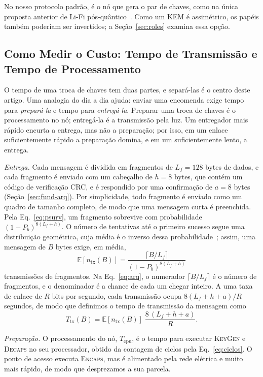 \documentclass[12pt]{article}
\begin{document}
No nosso protocolo padrão, é o nó que gera o par de chaves, como na única
proposta anterior de Li-Fi pós-quântico~\cite{nurmurodov2025esp32}. Como um KEM
é assimétrico, os papéis também poderiam ser invertidos; a
Seção~\ref{sec:roles} examina essa opção.

\subsection{Como Medir o Custo: Tempo de Transmissão e Tempo de Processamento}\label{sec:cost}
O tempo de uma troca de chaves tem duas partes, e separá-las é o centro deste
artigo. Uma analogia do dia a dia ajuda: enviar uma encomenda exige tempo para
\emph{prepará-la} e tempo para \emph{entregá-la}. Preparar uma troca de chaves
é o processamento no nó; entregá-la é a transmissão pela luz. Um entregador
mais rápido encurta a entrega, mas não a preparação; por isso, em um enlace
suficientemente rápido a preparação domina, e em um suficientemente lento, a
entrega.

\emph{Entrega.} Cada mensagem é dividida em fragmentos de $L_f=128$ bytes de
dados, e cada fragmento é enviado com um cabeçalho de $h=8$ bytes, que contém
um código de verificação CRC, e é respondido por uma confirmação de $a=8$ bytes
(Seção~\ref{sec:fund-arq}). Por simplicidade, todo fragmento é enviado como um
quadro de tamanho completo, de modo que uma mensagem curta é preenchida. Pela
Eq.~\eqref{eq:psurv}, um fragmento sobrevive com probabilidade
$(1-P_b)^{8(L_f+h)}$. O número de tentativas até o primeiro sucesso segue uma
distribuição geométrica, cuja média é o inverso dessa
probabilidade~\cite{bertsekas1992data}; assim, uma mensagem de $B$ bytes exige,
em média,
\begin{equation}
\mathbb{E}[n_{\mathrm{tx}}(B)] =
   \frac{\lceil B/L_f \rceil}{\left(1-P_b\right)^{8(L_f+h)}}
\label{eq:arq}
\end{equation}
transmissões de fragmentos. Na Eq.~\eqref{eq:arq}, o numerador
$\lceil B/L_f\rceil$ é o número de fragmentos, e o denominador é a chance de
cada um chegar inteiro. A uma taxa de enlace de $R$ bits por segundo, cada
transmissão ocupa $8(L_f+h+a)/R$ segundos, de modo que definimos o tempo de
transmissão da mensagem como
\begin{equation}
T_{\mathrm{tx}}(B) = \mathbb{E}[n_{\mathrm{tx}}(B)]\;\frac{8\,(L_f+h+a)}{R}.
\label{eq:tair}
\end{equation}

\emph{Preparação.} O processamento do nó, $T_{\mathrm{cpu}}$, é o tempo para
executar \textsc{KeyGen} e \textsc{Decaps} no seu processador, obtido da
contagem de ciclos pela Eq.~\eqref{eq:ciclos}. O ponto de acesso executa
\textsc{Encaps}, mas é alimentado pela rede elétrica e muito mais rápido, de
modo que desprezamos a sua parcela.
\end{document}
